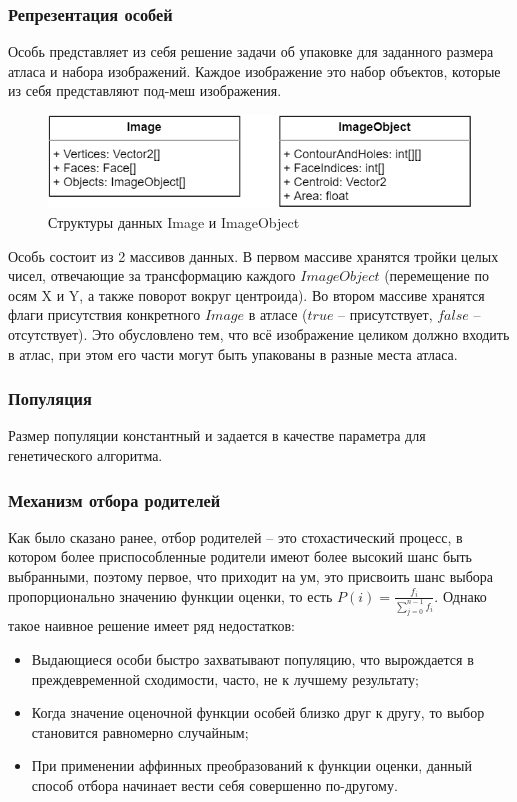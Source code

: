 \documentclass{fefu_thesis/cls/fefu}
\begin{document}
    \subsubsection{Репрезентация особей}
    Особь представляет из себя решение задачи об упаковке для заданного размера атласа и набора изображений. Каждое изображение это набор объектов, которые из себя представляют под-меш изображения.

    \begin{figure}[H]
        \centering
        \includegraphics[scale=0.7]{images/Image.png}
        \caption{Структуры данных Image и ImageObject}
    \end{figure}

    Особь состоит из 2 массивов данных. В первом массиве хранятся тройки целых чисел, отвечающие за трансформацию каждого $ImageObject$ (перемещение по осям X и Y, а также поворот вокруг центроида). Во втором массиве хранятся флаги присутствия конкретного $Image$ в атласе ($true$ -- присутствует, $false$ -- отсутствует). Это обусловлено тем, что всё изображение целиком должно входить в атлас, при этом его части могут быть упакованы в разные места атласа.

    \subsubsection{Популяция}

    Размер популяции константный и задается в качестве параметра для генетического алгоритма.

    \subsubsection{Механизм отбора родителей}

    Как было сказано ранее, отбор родителей -- это стохастический процесс, в котором более приспособленные родители имеют более высокий шанс быть выбранными, поэтому первое, что приходит на ум, это присвоить шанс выбора пропорционально значению функции оценки, то есть $P\left(i\right) = \frac{f_i}{\sum_{j=0}^{n - 1} f_i}$. Однако такое наивное решение имеет ряд недостатков:

    \begin{itemize}
        \item Выдающиеся особи быстро захватывают популяцию, что вырождается в преждевременной сходимости, часто, не к лучшему результату;
        \item Когда значение оценочной функции особей близко друг к другу, то выбор становится равномерно случайным;
        \item При применении аффинных преобразований к функции оценки, данный способ отбора начинает вести себя совершенно по-другому.
    \end{itemize}
\end{document}
